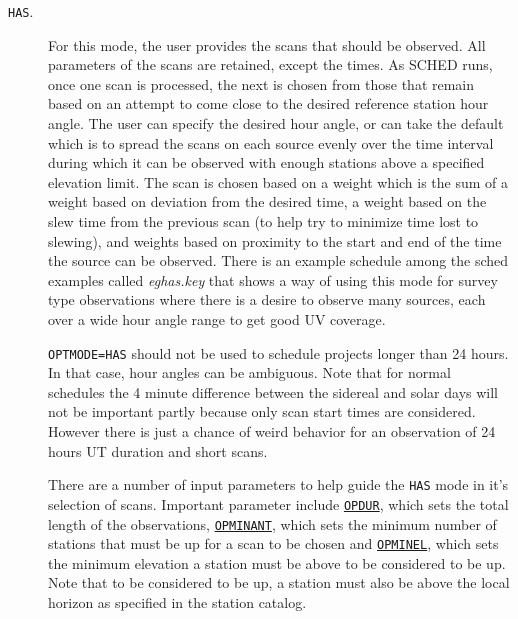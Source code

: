 \documentclass{report}
\begin{document}
\begin{description}
\item[{\tt HAS}.] For this mode, the user provides the scans that
should be observed.  All parameters of the scans are retained, except
the times.  As SCHED runs, once one scan is processed, the next is
chosen from those that remain based on an attempt to come close to the
desired reference station hour angle.  The user can specify the
desired hour angle, or can take the default which is to spread the
scans on each source evenly over the time interval during which it can
be observed with enough stations above a specified elevation limit.
The scan is chosen based on a weight which is the sum of a weight
based on deviation from the desired time, a weight based on the slew
time from the previous scan (to help try to minimize time lost to
slewing), and weights based on proximity to the start and end of the
time the source can be observed.  There is an example schedule among
the sched examples called {\sl eghas.key} that shows a way of using
this mode for survey type observations where there is a desire to
observe many sources, each over a wide hour angle range to get good UV
coverage.

{\tt OPTMODE=HAS} should not be used to schedule projects longer than
24 hours.  In that case, hour angles can be ambiguous.  Note that for
normal schedules the 4 minute difference between the sidereal and solar
days will not be important partly because only scan start times are
considered.  However there is just a chance of weird behavior for an
observation of 24 hours UT duration and short scans.

There are a number of input parameters to help guide the {\tt HAS}
mode in it's selection of scans.  Important parameter include
{\hyperref[MP:OPDUR]{{\tt OPDUR}}}, which sets the total length of the
observations, 
{\hyperref[MP:OPMINANT]{{\tt OPMINANT}}}, which sets the
minimum number of stations that must be up for a scan to be chosen and
{\hyperref[MP:OPMINEL]{{\tt OPMINEL}}}, which sets the minimum elevation
a station must be above to be considered to be up.  Note that to be
considered to be up, a station must also be above the local horizon as
specified in the station catalog.


\end{description}
\end{document}
